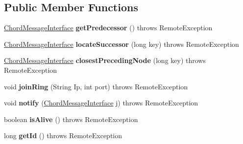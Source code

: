 \subsection*{Public Member Functions}
\begin{DoxyCompactItemize}
\item 
\mbox{\label{interface_chord_message_interface_ab07c08ba6088ef880eaf4ebae8281c51}} 
\mbox{\hyperlink{interface_chord_message_interface}{Chord\+Message\+Interface}} {\bfseries get\+Predecessor} ()  throws Remote\+Exception
\item 
\mbox{\label{interface_chord_message_interface_ab7df61ab2cfee0f39206014d7a42b063}} 
\mbox{\hyperlink{interface_chord_message_interface}{Chord\+Message\+Interface}} {\bfseries locate\+Successor} (long key)  throws Remote\+Exception
\item 
\mbox{\label{interface_chord_message_interface_a1d54a4ccd64382455af7dccfd0d6f95f}} 
\mbox{\hyperlink{interface_chord_message_interface}{Chord\+Message\+Interface}} {\bfseries closest\+Preceding\+Node} (long key)  throws Remote\+Exception
\item 
\mbox{\label{interface_chord_message_interface_abc5a9483416a6b8ae7330b324869e236}} 
void {\bfseries join\+Ring} (String Ip, int port)  throws Remote\+Exception
\item 
\mbox{\label{interface_chord_message_interface_abbb77f94541073d79284d35f970e0eb4}} 
void {\bfseries notify} (\mbox{\hyperlink{interface_chord_message_interface}{Chord\+Message\+Interface}} j)  throws Remote\+Exception
\item 
\mbox{\label{interface_chord_message_interface_a8165b3fb53905e657c70b66223197561}} 
boolean {\bfseries is\+Alive} ()  throws Remote\+Exception
\item 
\mbox{\label{interface_chord_message_interface_aaa28e7b91333c557955404ee8d26d65a}} 
long {\bfseries get\+Id} ()  throws Remote\+Exception
\item 
\mbox{\label{interface_chord_message_interface_a0731e7364624abf44be7ddb7a0d34341}} 

\end{DoxyCompactItemize}
